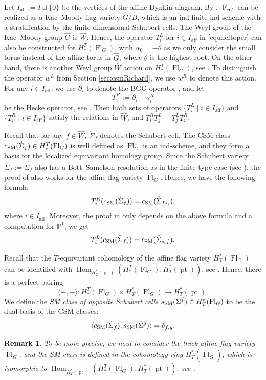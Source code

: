 \documentclass[12pt]{amsart}
\newtheorem{Rmk}[Th]{Remark}
\def\CSM{c_{\rm SM}}
\def\SSM{s_{\rm SM}}
\def\pt{\operatorname{pt}}
\def\Fl{\operatorname{Fl}}
\def\Hom{\operatorname{Hom}}
\def\aff{\operatorname{aff}}
\begin{document}
Let $I_{\aff}:=I\sqcup\{0\}$ be the vertices of the affine Dynkin diagram. By \cite{Ku02}, $\Fl_G$ can be realized as a Kac--Moody flag variety $\hat{G}/\hat{B}$, which is an ind-finite ind-scheme with a stratification by the finite-dimensional Schubert cells. The Weyl group of the Kac--Moody group $\hat{G}$ is $\widehat{W}$. Hence, the operator $T_i^L$ for $i\in I_{\aff}$ in  \eqref{equ:leftoper} can also be constructed for $H_*^T(\Fl_G)$, with $\alpha_0=-\theta$
as we only consider the small torus instead of the affine torus in $\hat{G}$, where $\theta$ is the highest root. 
On the other hand, there is another Weyl group $\widehat{W}$ action on $H_*^T(\Fl_G)$, see \cite[Definition 5.8]{KK86}. To distinguish the operator $w^L$ from Section \ref{sec:csmRichard}, we use $w^R$ to denote this action. For any $i\in I_{\aff}$, we use $\partial_i$ to denote the BGG operator \cite{BGG}, and let \[T_i^R:=\partial_i-s_i^R\] be the Hecke operator, see \cite{AM16, MNS}. Then both  sets of  operators $\{T_i^L\mid i\in I_{\aff}\}$ and $\{T_i^R\mid i\in I_{\aff}\}$ satisfy the relations in $\widehat{W}$, and $T_i^RT_j^L=T_j^LT_i^R$.

Recall that for any $f\in \widehat{W}$, $\mathring{\Sigma}_{f}$ denotes the Schubert cell. The CSM class $\CSM(\mathring{\Sigma}_{f})\in H_*^T(\Fl_G)$ is well defined as $\Fl_G$ is an ind-scheme, and they form a basis for the localized equivariant homology group. Since the Schubert variety $\Sigma_f:=\overline{\mathring{\Sigma}_{f}}$ also has a Bott--Samelson resolution as in the finite type case (see \cite{Ku02}), the proof of \cite[Theorem 1.1]{AM16} also works for the affine flag variety $\Fl_G$. Hence, we have the following formula
\[T_i^R(\CSM(\mathring{\Sigma}_{f}))=\CSM(\mathring{\Sigma}_{fs_i}),\]
where $i\in I_{\aff}$. Moreover, the proof in \cite[Theorem 4.3]{MNS} only depends on the above formula and a computation for $\mathbb{P}^1$, we get
\[T_i^L(\CSM(\mathring{\Sigma}_{f}))=\CSM(\mathring{\Sigma}_{s_if}).\]

Recall that the $T$-equivariant cohomology of the affine flag variety $H_T^{*}(\Fl_G)$ can be identified with $\Hom_{H^*_T(\pt)}(H^T_{*}(\Fl_G),H_T^{*}(\pt))$, see \cite[Chapter 4]{LLMSSZ14}. Hence, there is a perfect pairing 
\[\langle -,-\rangle: H^T_{*}(\Fl_G) \times H_T^{*}(\Fl_G) \rightarrow H_T^*(\pt).\]
We define the \emph{SM class of opposite Schubert cells} $\SSM(\mathring{\Sigma}^{f})\in H_T^{*}(\Fl_G)$ to be the dual basis of the CSM classes:
\begin{equation}\label{equ:defssm}
    \langle \CSM(\mathring{\Sigma} _f), \SSM(\mathring{\Sigma}^{g})\rangle=\delta_{f,g}.
\end{equation}
\begin{Rmk}
    To be more precise, we need to consider the thick affine flag variety $\tilde{\Fl}_G$, and the SM class is defined in the cohomology ring $H_T^*(\tilde{\Fl}_G)$, which is isomorphic to $\Hom_{H^*_T(\pt)}(H^T_{*}(\Fl_G),H_T^{*}(\pt))$, see \cite[Proposition 3.46 in Chapter 4]{LLMSSZ14}.
\end{Rmk}
\end{document}
